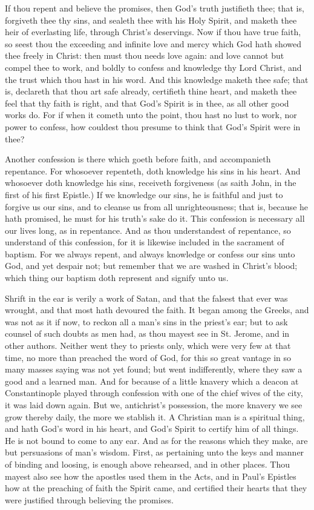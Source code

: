 If thou repent and believe the promises, then God's 
truth justifieth thee; that is, forgiveth thee thy sins, and 
sealeth thee with his Holy Spirit, and maketh thee heir of 
everlasting life, through Christ's deservings. Now if thou 
have true faith, so seest thou the exceeding and infinite 
love and mercy which God hath showed thee freely in 
Christ: then must thou needs love again: and love 
cannot but compel thee to work, and boldly to confess and 
knowledge thy Lord Christ, and the trust which thou 
hast in his word. And this knowledge maketh thee safe; 
that is, declareth that thou art safe already, certifieth thine 
heart, and maketh thee feel that thy faith is right, and 
that God's Spirit is in thee, as all other good works do. 
For if when it cometh unto the point, thou hast no lust 
to work, nor power to confess, how couldest thou presume
to think that God's Spirit were in thee? 

Another confession is there which goeth before faith, 
and accompanieth repentance. For whosoever repenteth, 
doth knowledge his sins in his heart. And whosoever 
doth knowledge his sins, receiveth forgiveness (as saith 
John, in the first of his first Epistle.) If we knowledge 
our sins, he is faithful and just to forgive us our sins, and
to cleanse us from all unrighteousness; that is, because 
he hath promised, he must for his truth's sake do it. This 
confession is necessary all our lives long, as in repentance. 
And as thou understandest of repentance, so understand 
of this confession, for it is likewise included in the sacrament
of baptism. For we always repent, and always 
knowledge or confess our sins unto God, and yet despair 
not; but remember that we are washed in Christ's blood;
which thing our baptism doth represent and signify 
unto us. 

Shrift in the ear is verily a work of Satan, and that the
falsest that ever was wrought, and that most hath devoured
the faith. It began among the Greeks, and was
not as it if now, to reckon all a man's sins in the priest's
ear; but to ask counsel of such doubts as men had, as thou 
mayest see in St. Jerome, and in other authors. Neither 
went they to priests only, which were very few at that 
time, no more than preached the word of God, for this 
so great vantage in so many masses saying was not yet 
found; but went indifferently, where they saw a good and 
a learned man. And for because of a little knavery 
which a deacon at Constantinople played through confession
with one of the chief wives of the city, it was laid 
down again. But we, antichrist's possession, the more 
knavery we see grow thereby daily, the more we stablish 
it. A Christian man is a spiritual thing, and hath God's 
word in his heart, and God's Spirit to certify him of all 
things. He is not bound to come to any ear. And as for 
the reasons which they make, are but persuasions of man's 
wisdom. First, as pertaining unto the keys and manner 
of binding and loosing, is enough above rehearsed, and in 
other places. Thou mayest also see how the apostles used 
them in the Acts, and in Paul's Epistles how at the
preaching of faith the Spirit came, and certified their
hearts that they were justified through believing the promises.

